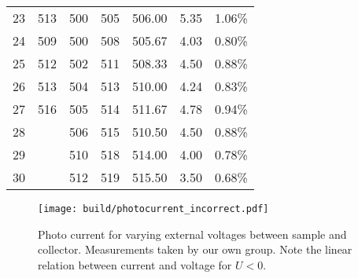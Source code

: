 \begin{table*}
\begin{tabular}{c c c c c c c}
    23&513   &500&505&506.00&5.35&1.06\% \\
    24&509   &500&508&505.67&4.03&0.80\% \\
    25&512   &502&511&508.33&4.50&0.88\% \\
    26&513   &504&513&510.00&4.24&0.83\% \\
    27&516   &505&514&511.67&4.78&0.94\% \\
    28&&506&515&510.50&4.50&0.88\% \\
    29&&510&518&514.00&4.00&0.78\% \\
    30&&512&519&515.50&3.50&0.68\% \\
  \end{tabular}
\end{table*}


\begin{figure*}
  \centering
  \texttt{[image: build/photocurrent\_incorrect.pdf]}
  \caption{Photo current for varying external voltages between sample and collector. Measurements taken by our own group. Note the linear relation between current and voltage for $U<0$.}
  \label{fig:photocurrent_own}
\end{figure*}
